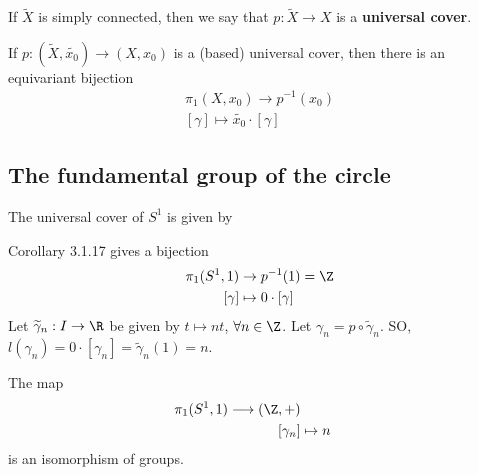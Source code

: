 \documentclass{article}
\numberwithin{nthm}{subsection}
\begin{document}
\begin{defi}
    If $\widetilde{X}$ is simply connected, then we say that $p:\widetilde{X} \to X$ is a \textbf{universal cover}.
\end{defi}

\begin{cor}
    If $p: (\widetilde{X}, \widetilde{x_0}) \to (X, x_0)$ is a (based) universal cover, then there is an equivariant bijection
    \begin{align*}
        \pi_1(X, x_0) \rightarrow p^{-1}(x_0) \\
        [\gamma] \longmapsto \widetilde{x_0} \cdot [\gamma]
    \end{align*}
\end{cor}

\subsection{The fundamental group of the circle}

The universal cover of $S^1$ is given by
\begin{center}
\end{center}

Corollary 3.1.17 gives a bijection
\begin{align*}
    \pi_1(S^1, 1) &\rightarrow p^{-1}(1) = \Z \\
    [\gamma] &\mapsto 0 \cdot [\gamma]
\end{align*}
Let $\widetilde{\gamma}_n: I \to \R$ be given by $t \mapsto nt$, $\forall n \in \Z$. Let $\gamma_n = p \circ \widetilde{\gamma}_n$. SO, $l(\gamma_n) = 0 \cdot [\gamma_n] = \widetilde{\gamma}_n (1) = n$.

\begin{thm}
    The map
    \begin{align*}
        \pi_1(S^1, 1) \longrightarrow (\Z, +) \\
        [\gamma_n] &\mapsto n
    \end{align*}
    is an isomorphism of groups.
\end{thm}
\end{document}
